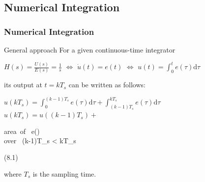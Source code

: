 \subsection{Numerical Integration}

\begin{frame}
	\frametitle{Numerical Integration}
	\begin{block}{General approach}
		For a given continuous-time integrator\\
		\begin{center}
			$H(s) = \frac{U(s)}{E(s)} = \frac{1}{s}$ \hspace{0.5em}
			$\Leftrightarrow$  \hspace{0.5em} $\dot{u}(t)= e(t)$ \hspace{0.5em} $\Leftrightarrow$ \hspace{0.5em} $u(t) = \int_0^t e(\tau)\mathrm{d}\tau$\\
		\end{center}
		
		its output at $t = kT_s$ can be written as follows:\\
		\begin{center}
			$u(kT_s) = \int_0^{(k-1)T_s} e(\tau)\mathrm{d}\tau + \int_{(k-1)T_s}^{kT_s} e(\tau)\mathrm{d}\tau$\\
			$u(kT_s) = u((k-1)T_s)+ $
			\begin{cases}
				\mbox{area of }  e(\tau)\\
				\mbox{over } (k-1)T_s \leq \tau < kT_s
			\end{cases}
			(8.1)
		\end{center}
		where $T_s$ is the sampling time.
	\end{block}
\end{frame}

